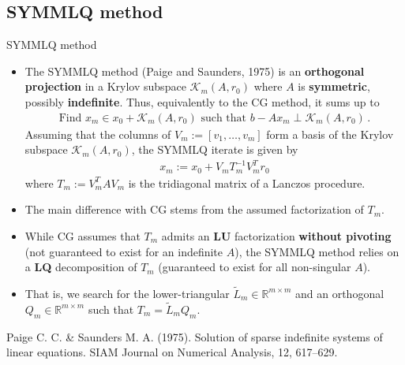 \documentclass[t,usepdftitle=false]{beamer}
\begin{document}
\subsection{SYMMLQ method}
\begin{frame}{SYMMLQ method}
\begin{itemize}
\item The SYMMLQ method (Paige and Saunders, 1975) is an \textbf{orthogonal projection} in a Krylov subspace $\mathcal{K}_m(A,r_0)$ where $A$ is \textbf{symmetric}, possibly \textbf{indefinite}.
Thus, equivalently to the CG method, it sums up to
\begin{align*}
\boxed{
\text{Find }x_m\in x_0+\mathcal{K}_m(A,r_0)
\text{ such that }
b-Ax_m\perp\mathcal{K}_m(A,r_0)
}\,.
\end{align*}
Assuming that the columns of $V_m:=[v_1,\dots,v_m]$ form a basis of the Krylov subspace $\mathcal{K}_m(A,r_0)$, the SYMMLQ iterate is given by
\begin{align*}
x_m:=x_0+V_mT_m^{-1}V_m^Tr_0
\end{align*}
where $T_m:=V_m^TAV_m$ is the tridiagonal matrix of a Lanczos procedure.
\item[] The main difference with CG stems from the assumed factorization of $T_m$.
\item[] While CG assumes that $T_m$ admits an \textbf{LU} factorization \textbf{without pivoting} (not guaranteed to exist for an indefinite $A$), the SYMMLQ method relies on a \textbf{LQ} decomposition of $T_m$ (guaranteed to exist for all non-singular $A$).
\item[] That is, we search for the lower-triangular $\tilde{L}_m\in\mathbb{R}^{m\times m}$ and an orthogonal $Q_m\in\mathbb{R}^{m\times m}$ such that $T_m=\tilde{L}_mQ_m$.
\end{itemize}\smallskip
\tiny{Paige C. C. \& Saunders M. A. (1975). Solution of sparse indefinite systems of linear equations. SIAM
Journal on Numerical Analysis, 12, 617–629.}
\end{frame}
\end{document}
